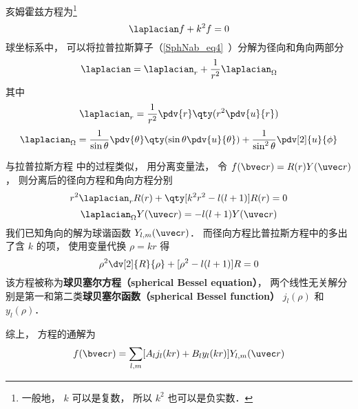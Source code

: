 

亥姆霍兹方程为\footnote{一般地， $k$ 可以是复数， 所以 $k^2$ 也可以是负实数．}
\begin{equation}
\laplacian f + k^2 f = 0
\end{equation}
球坐标系中， 可以将拉普拉斯算子（\autoref{SphNab_eq4}~）分解为径向和角向两部分
\begin{equation}
\laplacian = \laplacian_r + \frac{1}{r^2}\laplacian_{\Omega}
\end{equation}
其中
\begin{equation}
\laplacian_r = \frac{1}{r^2} \pdv{r} \qty(r^2 \pdv{u}{r})
\end{equation}
\begin{equation}
\laplacian_\Omega = \frac{1}{\sin\theta}\pdv{\theta} \qty(\sin \theta \pdv{u}{\theta}) + \frac{1}{\sin^2 \theta} \pdv[2]{u}{\phi}
\end{equation}


与拉普拉斯方程 中的过程类似， 用分离变量法， 令 $f(\bvec r) = R(r) Y(\uvec r)$， 则分离后的径向方程和角向方程分别
\begin{equation}
r^2\laplacian_r R(r) + \qty[k^2 r^2 - l(l+1)] R(r) = 0
\end{equation}
\begin{equation}
\laplacian_{\Omega} Y(\uvec r) = -l(l+1) Y(\uvec r)
\end{equation}
我们已知角向的解为球谐函数 $Y_{l,m}(\uvec r)$． 而径向方程比普拉斯方程中的多出了含 $k$ 的项， 使用变量代换 $\rho = kr$ 得
\begin{equation}
\rho^2\dv[2]{R}{\rho} + [\rho^2 - l(l+1)] R = 0
\end{equation}
该方程被称为\textbf{球贝塞尔方程（spherical Bessel equation）}， 两个线性无关解分别是第一和第二类\textbf{球贝塞尔函数（spherical Bessel function）} $j_l(\rho)$ 和 $y_l(\rho)$．

综上， 方程的通解为
\begin{equation}
f(\bvec r) = \sum_{l,m} [A_l j_l(kr) + B_l y_l(kr)] Y_{l,m}(\uvec r)
\end{equation}
